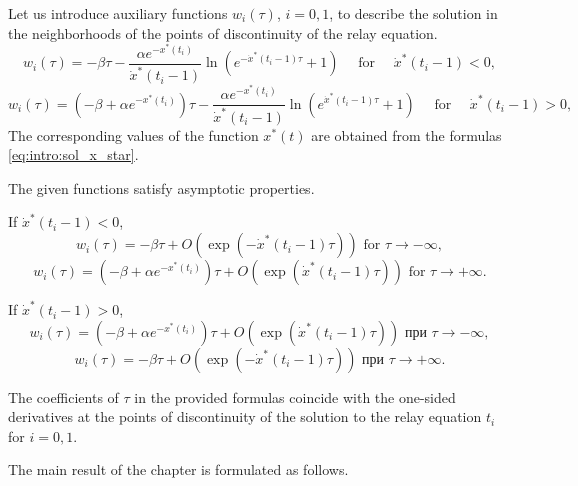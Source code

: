 Let us introduce auxiliary functions $w_i(\tau)$, $i = 0, 1$, to describe the solution in the neighborhoods of the points of discontinuity of the relay equation.
\[
w_i(\tau) = -\beta \tau - \dfrac{\alpha e^{-x^*(t_i)}}{\dot{x}^*(t_i - 1)} \ln\left(e^{-\dot{x}^*(t_i - 1)\tau} + 1\right) \quad \text{ for } \quad \dot{x}^*(t_i - 1) < 0,
\]
\[
w_i(\tau) = (-\beta + \alpha e^{-x^*(t_i)})\tau - \dfrac{\alpha e^{-x^*(t_i)}}{\dot{x}^*(t_i - 1)} \ln\left(e^{\dot{x}^*(t_i - 1)\tau} + 1\right) \quad \text{ for } \quad \dot{x}^*(t_i - 1) > 0,
\]
The corresponding values of the function $x^*(t)$ are obtained from the formulas \eqref{eq:intro:sol_x_star}.

The given functions satisfy asymptotic properties.

If $\dot{x}^*(t_i - 1) < 0$,
\begin{equation*}
	w_i(\tau) = -\beta \tau + O(\exp(-\dot{x}^*(t_i - 1) \tau)) \text{ for } \tau \to -\infty,
\end{equation*}
\begin{equation*}
	w_i(\tau) = (-\beta + \alpha e^{-x^*(t_i)})\tau + O(\exp(\dot{x}^*(t_i - 1) \tau)) \text{ for } \tau \to +\infty.
\end{equation*}

If $\dot{x}^*(t_i - 1) > 0$,
\begin{equation*}
	w_i(\tau) = (-\beta + \alpha e^{-x^*(t_i)})\tau + O(\exp(\dot{x}^*(t_i - 1) \tau)) \text{ при } \tau \to -\infty,
\end{equation*}
\begin{equation*}
	w_i(\tau) = -\beta \tau + O(\exp(-\dot{x}^*(t_i - 1) \tau)) \text{ при } \tau \to +\infty.
\end{equation*}

The coefficients of $\tau$ in the provided formulas coincide with the one-sided derivatives at the points of discontinuity of the solution to the relay equation $t_i$ for $i = 0, 1$.

The main result of the chapter is formulated as follows.

\bigskip

